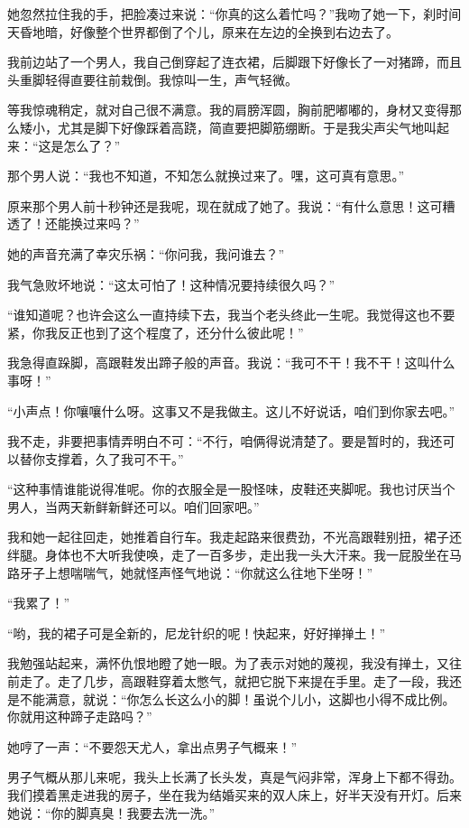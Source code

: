 她忽然拉住我的手，把脸凑过来说：“你真的这么着忙吗？”我吻了她一下，刹时间天昏地暗，好像整个世界都倒了个儿，原来在左边的全换到右边去了。 

我前边站了一个男人，我自己倒穿起了连衣裙，后脚跟下好像长了一对猪蹄，而且头重脚轻得直要往前栽倒。我惊叫一生，声气轻微。 

等我惊魂稍定，就对自己很不满意。我的肩膀浑圆，胸前肥嘟嘟的，身材又变得那么矮小，尤其是脚下好像踩着高跷，简直要把脚筋绷断。于是我尖声尖气地叫起来：“这是怎么了？” 

那个男人说：“我也不知道，不知怎么就换过来了。嘿，这可真有意思。” 

原来那个男人前十秒钟还是我呢，现在就成了她了。我说：“有什么意思！这可糟透了！还能换过来吗？” 

她的声音充满了幸灾乐祸：“你问我，我问谁去？” 

我气急败坏地说：“这太可怕了！这种情况要持续很久吗？” 

“谁知道呢？也许会这么一直持续下去，我当个老头终此一生呢。我觉得这也不要紧，你我反正也到了这个程度了，还分什么彼此呢！” 

我急得直跺脚，高跟鞋发出蹄子般的声音。我说：“我可不干！我不干！这叫什么事呀！” 

“小声点！你嚷嚷什么呀。这事又不是我做主。这儿不好说话，咱们到你家去吧。” 

我不走，非要把事情弄明白不可：“不行，咱俩得说清楚了。要是暂时的，我还可以替你支撑着，久了我可不干。” 

“这种事情谁能说得准呢。你的衣服全是一股怪味，皮鞋还夹脚呢。我也讨厌当个男人，当两天新鲜新鲜还可以。咱们回家吧。” 

我和她一起往回走，她推着自行车。我走起路来很费劲，不光高跟鞋别扭，裙子还绊腿。身体也不大听我使唤，走了一百多步，走出我一头大汗来。我一屁股坐在马路牙子上想喘喘气，她就怪声怪气地说：“你就这么往地下坐呀！” 

“我累了！” 

“哟，我的裙子可是全新的，尼龙针织的呢！快起来，好好掸掸土！” 

我勉强站起来，满怀仇恨地瞪了她一眼。为了表示对她的蔑视，我没有掸土，又往前走了。走了几步，高跟鞋穿着太憋气，就把它脱下来提在手里。走了一段，我还是不能满意，就说：“你怎么长这么小的脚！虽说个儿小，这脚也小得不成比例。你就用这种蹄子走路吗？” 

她哼了一声：“不要怨天尤人，拿出点男子气概来！” 

男子气概从那儿来呢，我头上长满了长头发，真是气闷非常，浑身上下都不得劲。我们摸着黑走进我的房子，坐在我为结婚买来的双人床上，好半天没有开灯。后来她说：“你的脚真臭！我要去洗一洗。” 

